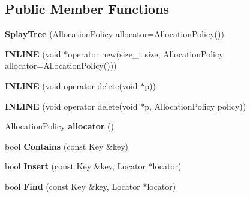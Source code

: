 \subsection*{Public Member Functions}
\begin{DoxyCompactItemize}
\item 
\hypertarget{classv8_1_1internal_1_1_splay_tree_a32079df13e173728baa4e30b22835155}{}{\bfseries Splay\+Tree} (Allocation\+Policy allocator=Allocation\+Policy())\label{classv8_1_1internal_1_1_splay_tree_a32079df13e173728baa4e30b22835155}

\item 
\hypertarget{classv8_1_1internal_1_1_splay_tree_aa2712b930607076703084d49a08fa715}{}{\bfseries I\+N\+L\+I\+N\+E} (void $\ast$operator new(size\+\_\+t size, Allocation\+Policy allocator=Allocation\+Policy()))\label{classv8_1_1internal_1_1_splay_tree_aa2712b930607076703084d49a08fa715}

\item 
\hypertarget{classv8_1_1internal_1_1_splay_tree_aa82a2181a29f67cab2be46b6acf8d548}{}{\bfseries I\+N\+L\+I\+N\+E} (void operator delete(void $\ast$p))\label{classv8_1_1internal_1_1_splay_tree_aa82a2181a29f67cab2be46b6acf8d548}

\item 
\hypertarget{classv8_1_1internal_1_1_splay_tree_abe023fb5b9ce3fed7322bbaf756231c0}{}{\bfseries I\+N\+L\+I\+N\+E} (void operator delete(void $\ast$p, Allocation\+Policy policy))\label{classv8_1_1internal_1_1_splay_tree_abe023fb5b9ce3fed7322bbaf756231c0}

\item 
\hypertarget{classv8_1_1internal_1_1_splay_tree_a1f246b50b6918ac8dd2651817ab43b20}{}Allocation\+Policy {\bfseries allocator} ()\label{classv8_1_1internal_1_1_splay_tree_a1f246b50b6918ac8dd2651817ab43b20}

\item 
\hypertarget{classv8_1_1internal_1_1_splay_tree_a2df37e47951b6090ecd2787663a96ab3}{}bool {\bfseries Contains} (const Key \&key)\label{classv8_1_1internal_1_1_splay_tree_a2df37e47951b6090ecd2787663a96ab3}

\item 
\hypertarget{classv8_1_1internal_1_1_splay_tree_aeadaecb47733848fb6b6eb835b9a729c}{}bool {\bfseries Insert} (const Key \&key, Locator $\ast$locator)\label{classv8_1_1internal_1_1_splay_tree_aeadaecb47733848fb6b6eb835b9a729c}

\item 
\hypertarget{classv8_1_1internal_1_1_splay_tree_ad055e7fd298d8c50d7772584469bda67}{}bool {\bfseries Find} (const Key \&key, Locator $\ast$locator)\label{classv8_1_1internal_1_1_splay_tree_ad055e7fd298d8c50d7772584469bda67}


\end{DoxyCompactItemize}
